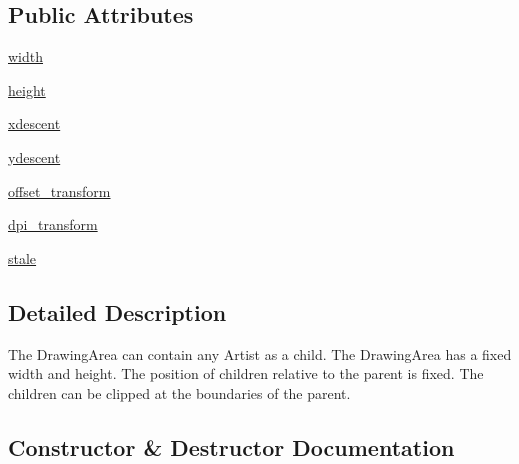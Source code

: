 \subsection*{Public Attributes}
\begin{DoxyCompactItemize}
\item 
\hyperlink{classmatplotlib_1_1offsetbox_1_1DrawingArea_a90f201ac6425e2778784e960eac9d717}{width}
\item 
\hyperlink{classmatplotlib_1_1offsetbox_1_1DrawingArea_ae78b32fdfdb0d92601f392f84aeaec72}{height}
\item 
\hyperlink{classmatplotlib_1_1offsetbox_1_1DrawingArea_a56e2ffca34fd8e580a950384e4284877}{xdescent}
\item 
\hyperlink{classmatplotlib_1_1offsetbox_1_1DrawingArea_a353119abd381521f7be70cbc14fe9d38}{ydescent}
\item 
\hyperlink{classmatplotlib_1_1offsetbox_1_1DrawingArea_a5494068dff33ff4be9f479e7cb447604}{offset\+\_\+transform}
\item 
\hyperlink{classmatplotlib_1_1offsetbox_1_1DrawingArea_ae351a1d93a510e3470bf80eadd9b4d4d}{dpi\+\_\+transform}
\item 
\hyperlink{classmatplotlib_1_1offsetbox_1_1DrawingArea_ab00a746d4f9e8b2a077bc08b7607ff0e}{stale}
\end{DoxyCompactItemize}


\subsection{Detailed Description}
\begin{DoxyVerb}The DrawingArea can contain any Artist as a child. The DrawingArea
has a fixed width and height. The position of children relative to
the parent is fixed. The children can be clipped at the
boundaries of the parent.
\end{DoxyVerb}
 

\subsection{Constructor \& Destructor Documentation}
\mbox{\label{classmatplotlib_1_1offsetbox_1_1DrawingArea_a61c4568da537047ebdf2589d7d72f478}} 
